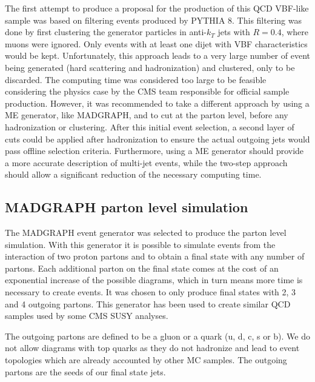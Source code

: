 The first attempt to produce a proposal for the production of this \gls{QCD} \gls{VBF}-like sample was based on filtering events produced by \textsc{PYTHIA 8}. This filtering was done by first clustering the generator particles in anti-$k_T$ jets with $R=0.4$, where muons were ignored. Only events with at least one dijet with \gls{VBF} characteristics would be kept. Unfortunately, this approach leads to a very large number of event being generated (hard scattering and hadronization) and clustered, only to be discarded. The computing time was considered too large to be feasible considering the physics case by the \gls{CMS} team responsible for official sample production. However, it was recommended to take a different approach by using a \gls{ME} generator, like \textsc{MADGRAPH}, and to cut at the parton level, before any hadronization or clustering. After this initial event selection, a second layer of cuts could be applied after hadronization to ensure the actual outgoing jets would pass offline selection criteria. Furthermore, using a \gls{ME} generator should provide a more accurate description of multi-jet events, while the two-step approach should allow a significant reduction of the necessary computing time. 

\subsection{\textsc{MADGRAPH} parton level simulation}
\label{SUBSECTION:RunIIPreparation_MadGraphPartonLevelSimulation}


The \textsc{MADGRAPH} event generator was selected to produce the parton level simulation. With this generator it is possible to simulate events from the interaction of two proton partons and to obtain a final state with any number of partons. Each additional parton on the final state comes at the cost of an exponential increase of the possible diagrams, which in turn means more time is necessary to create events. It was chosen to only produce final states with 2, 3 and 4 outgoing partons. This generator has been used to create similar \gls{QCD} samples used by some \gls{CMS} \gls{SUSY} analyses. 

The outgoing partons are defined to be a gluon or a quark (u, d, c, s or b). We do not allow diagrams with top quarks as they do not hadronize and lead to event topologies which are already accounted by other \gls{MC} samples. The outgoing partons are the seeds of our final state jets. 

